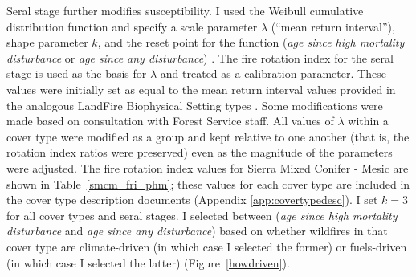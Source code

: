 \begin{itemize}
\begin{table}[htbp]
\end{table}

Seral stage further modifies susceptibility. I used the Weibull cumulative distribution function and specify a scale parameter $\lambda$ (``mean return interval''), shape parameter $k$, and the reset point for the function (\emph{age since high mortality disturbance} or \emph{age since any disturbance}) \citep{Johnson1985}. The fire rotation index for the seral stage is used as the basis for $\lambda$ and treated as a calibration parameter. These values were initially set as equal to the mean return interval values provided in the analogous LandFire Biophysical Setting types \citep{Landfire2007}. Some modifications were made based on consultation with Forest Service staff. All values of $\lambda$ within a cover type were modified as a group and kept relative to one another (that is, the rotation index ratios were preserved) even as the magnitude of the parameters were adjusted. The fire rotation index values for Sierra Mixed Conifer - Mesic are shown in Table~\ref{smcm_fri_phm}; these values for each cover type are included in the cover type description documents (Appendix \ref{app:covertypedesc}). I set $k=3$ for all cover types and seral stages. I selected between (\emph{age since high mortality disturbance} and \emph{age since any disturbance}) based on whether wildfires in that cover type are climate-driven (in which case I selected the former) or fuels-driven (in which case I selected the latter) (Figure~\ref{howdriven}).


\end{itemize}

